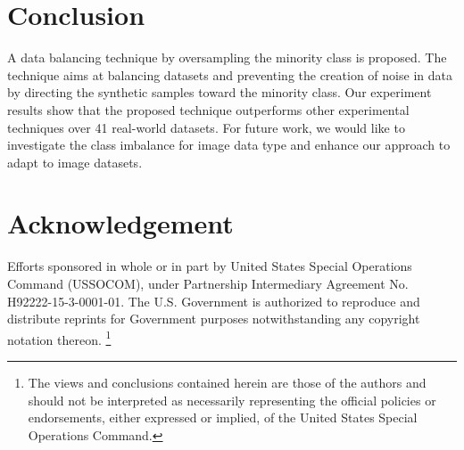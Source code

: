 \documentclass[journal]{IEEEtai}
\begin{document}






\section {Conclusion}
\label{sec:conclusion}
A data balancing technique by oversampling the minority class is proposed. The technique aims at balancing datasets and preventing the creation of noise in data by directing the synthetic samples toward the minority class. Our experiment results show that the proposed technique outperforms other experimental techniques over 41 real-world datasets. For future work, we would like to investigate the class imbalance for image data type and enhance our approach to adapt to image datasets.   

\section*{Acknowledgement}

Efforts sponsored in whole or in part by United States Special Operations Command (USSOCOM), under Partnership Intermediary Agreement No. H92222-15-3-0001-01. The U.S. Government is authorized to reproduce and distribute reprints for Government purposes notwithstanding any copyright notation thereon.  
{\footnote{ The views and conclusions contained herein are those of the authors and should not be interpreted as necessarily representing the official policies or endorsements, either expressed or implied, of the United States Special Operations Command.} }




\end{document}

